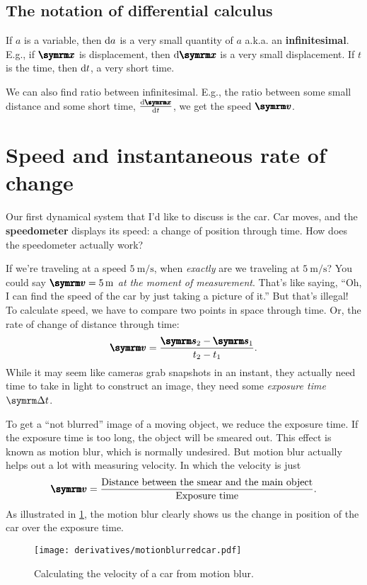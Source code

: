 \subsection{The notation of differential calculus}
\label{sec:notation_of_calculus_derivative}

If $a$ is a variable, then $\odif{a}$ is a very small quantity of $a$ a.k.a. an \textbf{infinitesimal}. E.g., if $\vv{x}$ is displacement, then $\odif{\vv{x}}$ is a very small displacement. If $t$ is the time, then $\odif{t}$, a very short time.

We can also find ratio between infinitesimal. E.g., the ratio between some small distance and some short time, $\odv{\vv{x}}{t}$, we get the speed $\vv{v}$.

\section{Speed and instantaneous rate of change}
\label{sec:speedandinstantaneousrateofchange}

Our first dynamical system that I'd like to discuss is the car. Car moves, and the \textbf{speedometer} displays its speed: a change of position through time. How does the speedometer actually work?

If we're traveling at a speed $\qty{5}{\meter\per\second}$, when \emph{exactly} are we traveling at $\qty{5}{\meter\per\second}$? You could say $\vv{v} = \qty{5}{\meter}$ \emph{at the moment of measurement}. That's like saying, \enquote{Oh, I can find the speed of the car by just taking a picture of it.} But that's illegal! To calculate speed, we have to compare two points in space through time. Or, the rate of change of distance through time:
\begin{equation}
    \vv{v} = \frac{\vv{s}_2 - \vv{s}_1}{t_2 - t_1}.
\end{equation}
While it may seem like cameras grab snapshots in an instant, they actually need time to take in light to construct an image, they need some \emph{exposure time} $\Dd{t}$.

To get a \enquote{not blurred} image of a moving object, we reduce the exposure time. If the exposure time is too long, the object will be smeared out. This effect is known as motion blur, which is normally undesired. But motion blur actually helps out a lot with measuring velocity. In which the velocity is just 
\begin{equation}
    \vv{v} = \frac{\textrm{Distance between the smear and the main object}}{\textrm{Exposure time}}.
\end{equation}
As illustrated in \cref{fig:car-motion-blur}, the motion blur clearly shows us the change in position of the car over the exposure time.
\begin{figure}[ht]
   \centering
   \texttt{[image: derivatives/motionblurredcar.pdf]} 
   \caption{Calculating the velocity of a car from motion blur.}
   \label{fig:car-motion-blur}
\end{figure}

